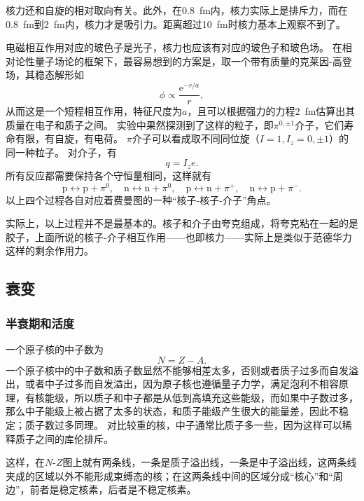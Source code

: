 \documentclass[UTF8, a4paper]{ctexart}
\newcommand*{\ee}{\mathrm{e}}
\begin{document}
核力还和自旋的相对取向有关。此外，在\SI{0.8}{fm}内，核力实际上是排斥力，而在\SI{0.8}{fm}到\SI{2}{fm}内，核力才是吸引力。距离超过\SI{10}{fm}时核力基本上观察不到了。

电磁相互作用对应的玻色子是光子，核力也应该有对应的玻色子和玻色场。
在相对论性量子场论的框架下，最容易想到的方案是，取一个带有质量的克莱因-高登场，其稳态解形如
\[
    \phi \propto \frac{\ee^{- r / a}}{r},
\]
从而这是一个短程相互作用，特征尺度为$a$，且可以根据强力的力程\SI{2}{fm}估算出其质量在电子和质子之间。
实验中果然探测到了这样的粒子，即$\pi^{0, \pm 1}$介子，它们寿命有限，有自旋，有电荷。
$\pi$介子可以看成取不同同位旋（$I=1,I_z=0, \pm 1$）的同一种粒子。
对介子，有
\begin{equation}
    q = I_z e.
\end{equation}
所有反应都需要保持各个守恒量相同，这样就有
\[
    \text{p} \longleftrightarrow \text{p} + \pi^0, \quad \text{n} \longleftrightarrow \text{n} + \pi^0, \quad \text{p} \longleftrightarrow \text{n} + \pi^+, \quad \text{n} \longleftrightarrow \text{p} + \pi^-. 
\]
以上四个过程各自对应着费曼图的一种“核子-核子-介子”角点。

实际上，以上过程并不是最基本的。核子和介子由夸克组成，将夸克粘在一起的是胶子，上面所说的核子-介子相互作用——也即核力——实际上是类似于范德华力这样的剩余作用力。

\subsection{衰变}

\subsubsection{半衰期和活度}

一个原子核的中子数为
\begin{equation}
    N = Z - A.
\end{equation}
一个原子核中的中子数和质子数显然不能够相差太多，否则或者质子过多而自发溢出，或者中子过多而自发溢出，因为原子核也遵循量子力学，满足泡利不相容原理，有核能级，所以质子和中子都是从低到高填充这些能级，而如果中子数过多，那么中子能级上被占据了太多的状态，和质子能级产生很大的能量差，因此不稳定；质子数过多同理。
对比较重的核，中子通常比质子多一些，因为这样可以稀释质子之间的库伦排斥。

这样，在$N$-$Z$图上就有两条线，一条是质子溢出线，一条是中子溢出线，这两条线夹成的区域以外不能形成束缚态的核；在这两条线中间的区域分成“核心”和“周边”，前者是稳定核素，后者是不稳定核素。
\end{document}
